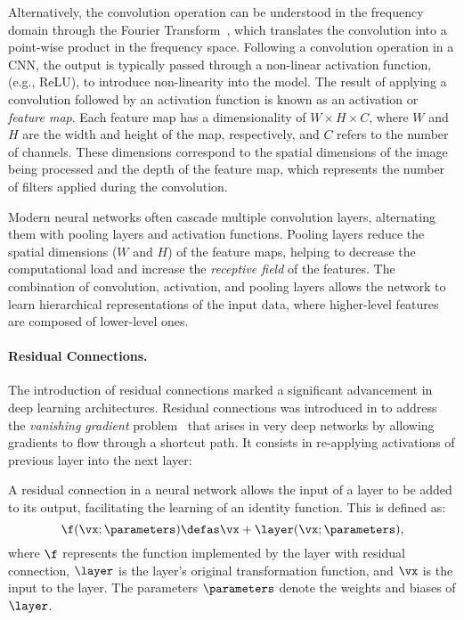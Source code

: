 Alternatively, the convolution operation can be understood in the frequency domain through the Fourier Transform~\cite{chi2020fast}, which translates the convolution into a point-wise product in the frequency space. Following a convolution operation in a CNN, the output is typically passed through a non-linear activation function, (e.g., ReLU), to introduce non-linearity into the model. The result of applying a convolution followed by an activation function is known as an activation or \textit{feature map}. Each feature map has a dimensionality of $W \times H \times C$, where $W$ and $H$ are the width and height of the map, respectively, and $C$ refers to the number of channels. These dimensions correspond to the spatial dimensions of the image being processed and the depth of the feature map, which represents the number of filters applied during the convolution. 

Modern neural networks often cascade multiple convolution layers, alternating them with pooling layers and activation functions. Pooling layers reduce the spatial dimensions ($W$ and $H$) of the feature maps, helping to decrease the computational load and increase the \textit{receptive field} of the features. The combination of convolution, activation, and pooling layers allows the network to learn hierarchical representations of the input data, where higher-level features are composed of lower-level ones.

\paragraph{Residual Connections.}
The introduction of residual connections marked a significant advancement in deep learning architectures. Residual connections was introduced in 
\cite{he2016deep} to address the \textit{vanishing gradient} problem~\cite{hochreiter1998vanishing} that arises in very deep networks by allowing gradients to flow through a shortcut path. It consists in re-applying activations of previous layer into the next layer: 

\begin{definition}
A residual connection in a neural network allows the input of a layer to be added to its output, facilitating the learning of an identity function. This is defined as:
\[
\f(\vx; \parameters) \defas \vx + \layer(\vx; \parameters),
\]
where $\f$ represents the function implemented by the layer with residual connection, $\layer$ is the layer's original transformation function, and $\vx$ is the input to the layer. The parameters $\parameters$ denote the weights and biases of $\layer$.
\end{definition}

